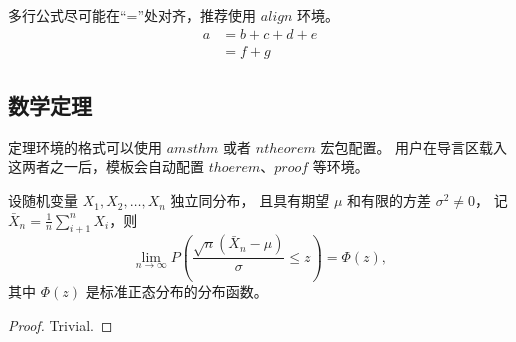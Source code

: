 多行公式尽可能在“=”处对齐，推荐使用 ${align}$ 环境。
\begin{align}
	a & = b + c + d + e \\
	& = f + g
\end{align}



\subsection{数学定理}

定理环境的格式可以使用 ${amsthm}$ 或者 ${ntheorem}$ 宏包配置。
用户在导言区载入这两者之一后，模板会自动配置 ${thoerem}$、${proof}$ 等环境。

\begin{theorem}
	设随机变量 $X_1,X_2, \dots, X_n$ 独立同分布， 且具有期望 $\mu$ 和有限的方差 $\sigma^2 \ne 0$，
	记 $\bar{X}_n = \frac{1}{n} \sum_{i+1}^n X_i$，则
	\begin{equation}
		\lim_{n \to \infty} P \left(\frac{\sqrt{n} \left( \bar{X}_n - \mu \right)}{\sigma} \le z \right) = \Phi(z),
	\end{equation}
	其中 $\Phi(z)$ 是标准正态分布的分布函数。
\end{theorem}
\begin{proof}
	Trivial.
\end{proof}
